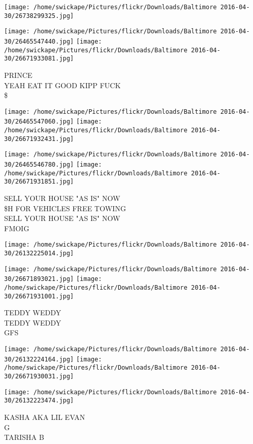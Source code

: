 \documentclass[10pt,letterpaper]{article}
\begin{document}
\texttt{[image: /home/swickape/Pictures/flickr/Downloads/Baltimore 2016-04-30/26738299325.jpg]}

\vspace{0.25in}
\texttt{[image: /home/swickape/Pictures/flickr/Downloads/Baltimore 2016-04-30/26465547440.jpg]}
\texttt{[image: /home/swickape/Pictures/flickr/Downloads/Baltimore 2016-04-30/26671933081.jpg]}

PRINCE\\
YEAH EAT IT GOOD KIPP FUCK\\
\$
\pagebreak

\texttt{[image: /home/swickape/Pictures/flickr/Downloads/Baltimore 2016-04-30/26465547060.jpg]}
\texttt{[image: /home/swickape/Pictures/flickr/Downloads/Baltimore 2016-04-30/26671932431.jpg]}

\texttt{[image: /home/swickape/Pictures/flickr/Downloads/Baltimore 2016-04-30/26465546780.jpg]}
\texttt{[image: /home/swickape/Pictures/flickr/Downloads/Baltimore 2016-04-30/26671931851.jpg]}

SELL YOUR HOUSE "AS IS" NOW\\
\$H FOR VEHICLES FREE TOWING\\
SELL YOUR HOUSE "AS IS" NOW\\
FMOIG
\pagebreak

\texttt{[image: /home/swickape/Pictures/flickr/Downloads/Baltimore 2016-04-30/26132225014.jpg]}

\vspace{0.25in}
\texttt{[image: /home/swickape/Pictures/flickr/Downloads/Baltimore 2016-04-30/26671893021.jpg]}
\texttt{[image: /home/swickape/Pictures/flickr/Downloads/Baltimore 2016-04-30/26671931001.jpg]}

TEDDY WEDDY\\
TEDDY WEDDY\\
GFS
\pagebreak

\texttt{[image: /home/swickape/Pictures/flickr/Downloads/Baltimore 2016-04-30/26132224164.jpg]}
\texttt{[image: /home/swickape/Pictures/flickr/Downloads/Baltimore 2016-04-30/26671930031.jpg]}

\texttt{[image: /home/swickape/Pictures/flickr/Downloads/Baltimore 2016-04-30/26132223474.jpg]}

KASHA AKA LIL EVAN\\
G\\
TARISHA B
\pagebreak
\end{document}

